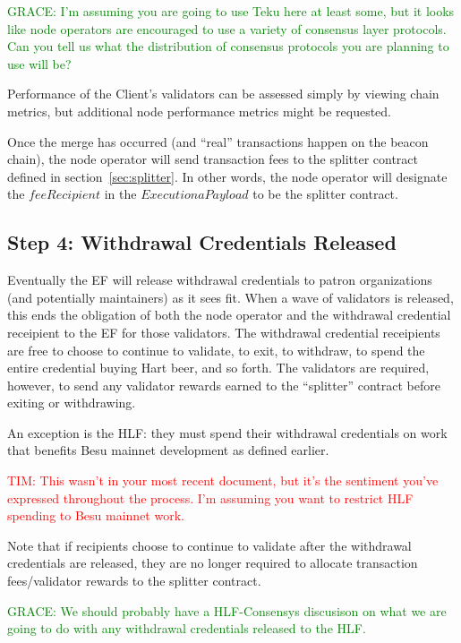 \textcolor{green}{GRACE:  I'm assuming you are going to use Teku here at least some, but it looks like node operators are encouraged to use a variety of consensus layer protocols.  Can you tell us what the distribution of consensus protocols you are planning to use will be?}

Performance of the Client’s validators can be assessed simply by viewing chain metrics, but additional node performance metrics might be requested.

Once the merge has occurred (and ``real'' transactions happen on the beacon chain), the node operator will send transaction fees to the splitter contract defined in section~\ref{sec:splitter}. In other words, the node operator will designate the $feeRecipient$ in the $ExecutionaPayload$ to be the splitter contract.

\subsection{Step 4:  Withdrawal Credentials Released}
Eventually the EF will release withdrawal credentials to patron organizations (and potentially maintainers) as it sees fit.  When a wave of validators is released, this ends the obligation of both the node operator and the withdrawal credential receipient to the EF for those validators. The withdrawal credential receipients are free to choose to continue to validate, to exit, to withdraw, to spend the entire credential buying Hart beer, and so forth.  The validators are required, however, to send any validator rewards earned to the ``splitter'' contract before exiting or withdrawing.

An exception is the HLF:  they must spend their withdrawal credentials on work that benefits Besu mainnet development as defined earlier.

\textcolor{red}{TIM:  This wasn't in your most recent document, but it's the sentiment you've expressed throughout the process.  I'm assuming you want to restrict HLF spending to Besu mainnet work.}

Note that if recipients choose to continue to validate after the withdrawal credentials are released, they are no longer required to allocate transaction fees/validator rewards to the splitter contract.

\textcolor{green}{GRACE:  We should probably have a HLF-Consensys discusison on what we are going to do with any withdrawal credentials released to the HLF.}